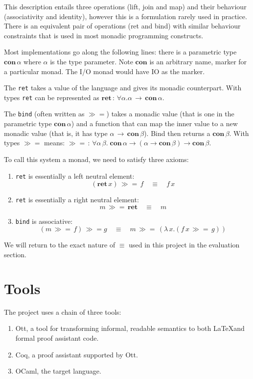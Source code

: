 \documentclass[12pt,twoside,notitlepage]{report}
\begin{document}
This description entails three operations (lift, join and map) and their behaviour (associativity and identity), however this is a formulation rarely used in practice. There is an equivalent pair of operations (ret and bind) with similar behaviour constraints that is used in most monadic programming constructs. 


Most implementations go along the following lines: there is a parametric type $ \textbf{con} \, \alpha $ where $ \alpha $ is the type parameter. Note $ \textbf{con} $ is an arbitrary name, marker for a particular monad. The I/O monad would have IO as the marker.

The \lstinline|ret| takes a value of the language and gives its monadic counterpart. With types \lstinline|ret| can be represented as $ \textbf{ret} \, :\, \forall \alpha. \alpha\, \rightarrow\, \textbf{con}\, \alpha $.

The \lstinline|bind| (often written as $ \gg= $)  takes a monadic value (that is one in the parametric type $ \textbf{con} \, \alpha $) and a function that can map the inner value to a new monadic value (that is, it has type $ \alpha \, \rightarrow \, \textbf{con} \, \beta $). Bind then returns a $ \textbf{con} \, \beta $. With types $ \gg= $ means: $ \gg= \, : \, \forall \alpha \, \beta. \; \textbf{con} \, \alpha \rightarrow (\alpha \rightarrow \textbf{con} \, \beta) \rightarrow \textbf{con} \, \beta $.

To call this system a monad, we need to satisfy three axioms:

\begin{enumerate}
\item{\lstinline|ret| is essentially a left neutral element:
\[ (\textbf{ret} \, x) \, \gg=\, f \quad \equiv \quad f \, x \]}
\item{\lstinline|ret| is essentially a right neutral element:
\[ m \, \gg=\, \textbf{ret} \quad \equiv \quad m \]}
\item{\lstinline|bind| is associative:
\[ (m \, \gg= \, f) \, \gg= g \quad \equiv \quad m\, \gg= \, (\lambda\, x. (f\, x \, \gg= \, g) ) \]}
\end{enumerate}

We will return to the exact nature of $ \equiv $ used in this project in the evaluation section.


\section{Tools}
The project uses a chain of three tools: \begin{enumerate}
\item{
Ott, a tool for transforming informal, readable semantics to both \LaTeX and formal proof assistant code.}
\item{Coq, a proof assistant supported by Ott. }
\item{OCaml, the target language. }
\end{enumerate}
\end{document}
